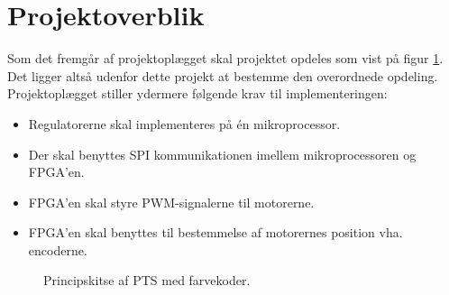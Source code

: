 \section{Projektoverblik}
\label{sec:projektoverblik}
Som det fremgår af projektoplægget skal projektet opdeles som vist på 
figur \ref{fig:overview_openloop_PTS}. 
Det ligger altså udenfor dette projekt at bestemme den overordnede opdeling.
Projektoplægget stiller ydermere følgende krav til implementeringen:
\begin{itemize}
\itemsep1pt
  \item Regulatorerne skal implementeres på én mikroprocessor.
  \item Der skal benyttes SPI kommunikationen imellem mikroprocessoren og FPGA’en.
  \item FPGA’en skal styre PWM-signalerne til motorerne.
  \item FPGA’en skal benyttes til bestemmelse af motorernes position vha. encoderne.
\end{itemize}

\bigskip

\begin{figure}[!th]
\centering
\begin{tikzpicture}[auto, node distance=1cm,>=latex']

\end{tikzpicture}
\caption[Principskitse af PTS]{Principskitse af PTS med farvekoder.}
\label{fig:overview_openloop_PTS}
\end{figure}



